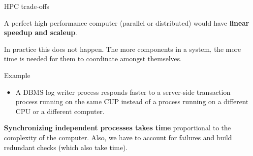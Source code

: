 \begin{frame}{HPC trade-offs}

A \alert{perfect high performance computer} (parallel or distributed) would have \textbf{linear speedup and scaleup}.

In practice this does not happen. The more components in a system, the more time is needed for them to coordinate amongst themselves.

\begin{block}{Example}
\begin{itemize}[-,noitemsep]
\item A DBMS log writer process responds faster to a server-side transaction process running on the same CUP instead of a process running on a different CPU or a different computer.
\end{itemize}
\end{block}

\textbf{Synchronizing independent processes takes time} proportional to the complexity of the computer. Also, we have to account for failures and build redundant checks (which also take time).
\end{frame}





